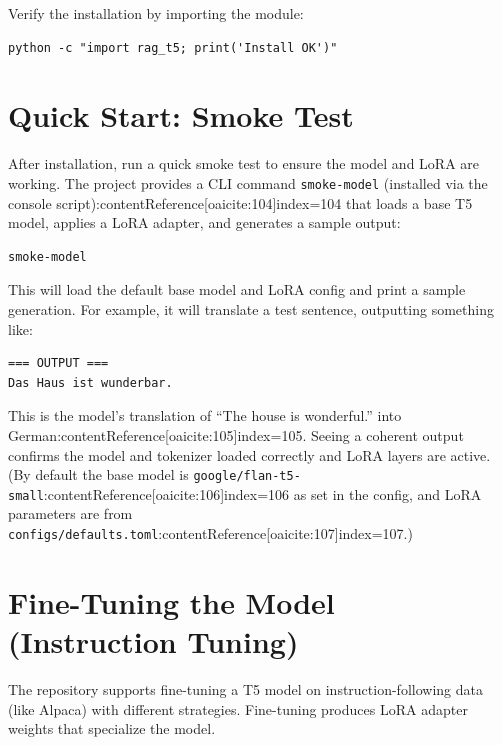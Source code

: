 \documentclass{article}
\begin{document}
Verify the installation by importing the module:
\begin{verbatim}
python -c "import rag_t5; print('Install OK')"
\end{verbatim}

\section{Quick Start: Smoke Test}
After installation, run a quick smoke test to ensure the model and LoRA are working. The project provides a CLI command \texttt{smoke-model} (installed via the console script):contentReference[oaicite:104]{index=104} that loads a base T5 model, applies a LoRA adapter, and generates a sample output:
\begin{verbatim}
smoke-model
\end{verbatim}
This will load the default base model and LoRA config and print a sample generation. For example, it will translate a test sentence, outputting something like:
\begin{verbatim}
=== OUTPUT ===
Das Haus ist wunderbar.
\end{verbatim}
This is the model’s translation of “The house is wonderful.” into German:contentReference[oaicite:105]{index=105}. Seeing a coherent output confirms the model and tokenizer loaded correctly and LoRA layers are active. (By default the base model is \texttt{google/flan-t5-small}:contentReference[oaicite:106]{index=106} as set in the config, and LoRA parameters are from \texttt{configs/defaults.toml}:contentReference[oaicite:107]{index=107}.)

\section{Fine-Tuning the Model (Instruction Tuning)}
The repository supports fine-tuning a T5 model on instruction-following data (like Alpaca) with different strategies. Fine-tuning produces LoRA adapter weights that specialize the model.
\end{document}
